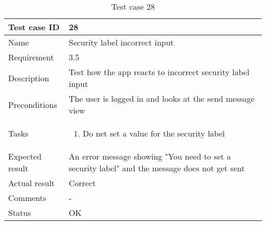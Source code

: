 				\begin{table}
			\begin{tabular}{l|p{10cm}}
				Test case ID & 28\\ \hline
				Name &Security label incorrect input\\ \hline
				Requirement & 3.5\\ \hline
				Description&Test how the app reacts to incorrect security label input\\ \hline
				Preconditions&The user is logged in and looks at the send message view\\ \hline
				Tasks&\begin{enumerate}
						\item{}Do net set a value for the security label
					\end{enumerate} \\ \hline
				Expected result&An error message showing "You need to set a security label" and the message does not get sent\\ \hline
				Actual result& Correct\\ \hline
				Comments&- \\ \hline
				Status& OK\\ \hline 
			\end{tabular}
			\caption{Test case 28} \label{tab:case28}
			\end{table}
